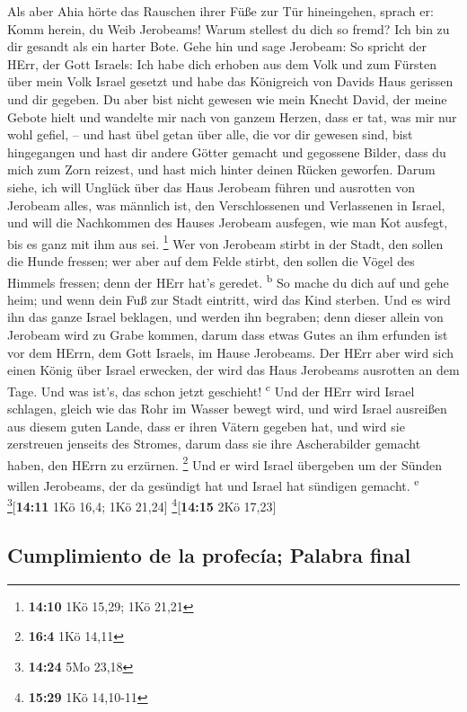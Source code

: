  Als aber Ahia hörte das Rauschen ihrer Füße zur Tür
hineingehen, sprach er: Komm herein, du Weib Jerobeams! Warum stellest
du dich so fremd? Ich bin zu dir gesandt als ein harter Bote.
 Gehe hin und sage Jerobeam: So spricht der HErr, der Gott
Israels: Ich habe dich erhoben aus dem Volk und zum Fürsten über mein
Volk Israel gesetzt  und habe das Königreich von Davids
Haus gerissen und dir gegeben. Du aber bist nicht gewesen wie mein
Knecht David, der meine Gebote hielt und wandelte mir nach von ganzem
Herzen, dass er tat, was mir nur wohl gefiel, --  und hast
übel getan über alle, die vor dir gewesen sind, bist hingegangen und
hast dir andere Götter gemacht und gegossene Bilder, dass du mich zum
Zorn reizest, und hast mich hinter deinen Rücken geworfen.
 Darum siehe, ich will Unglück über das Haus Jerobeam
führen und ausrotten von Jerobeam alles, was männlich ist, den
Verschlossenen und Verlassenen in Israel, und will die Nachkommen des
Hauses Jerobeam ausfegen, wie man Kot ausfegt, bis es ganz mit ihm aus
sei. \footnote{\textbf{14:10} 1Kö 15,29; 1Kö 21,21}  Wer
von Jerobeam stirbt in der Stadt, den sollen die Hunde fressen; wer aber
auf dem Felde stirbt, den sollen die Vögel des Himmels fressen; denn der
HErr hat's geredet. \textsuperscript{b}  So mache du dich
auf und gehe heim; und wenn dein Fuß zur Stadt eintritt, wird das Kind
sterben.  Und es wird ihn das ganze Israel beklagen, und
werden ihn begraben; denn dieser allein von Jerobeam wird zu Grabe
kommen, darum dass etwas Gutes an ihm erfunden ist vor dem HErrn, dem
Gott Israels, im Hause Jerobeams.  Der HErr aber wird
sich einen König über Israel erwecken, der wird das Haus Jerobeams
ausrotten an dem Tage. Und was ist's, das schon jetzt geschieht!
\textsuperscript{c}  Und der HErr wird Israel schlagen,
gleich wie das Rohr im Wasser bewegt wird, und wird Israel ausreißen aus
diesem guten Lande, dass er ihren Vätern gegeben hat, und wird sie
zerstreuen jenseits des Stromes, darum dass sie ihre Ascherabilder
gemacht haben, den HErrn zu erzürnen. \footnote{\textbf{16:4} 1Kö 14,11}
 Und er wird Israel übergeben um der Sünden willen
Jerobeams, der da gesündigt hat und Israel hat sündigen gemacht.
\textsuperscript{e} \footnote{\textbf{14:24} 5Mo 23,18}{[}\textbf{14:11}
1Kö 16,4; 1Kö 21,24{]} \footnote{\textbf{15:29} 1Kö 14,10-11}{[}\textbf{14:15}
2Kö 17,23{]}

\hypertarget{cumplimiento-de-la-profecuxeda-palabra-final}{%
\subsection{Cumplimiento de la profecía; Palabra
final}\label{cumplimiento-de-la-profecuxeda-palabra-final}}

